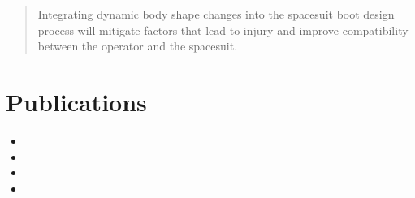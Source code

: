 \documentclass[defaultstyle,11pt]{comps}
\providecommand{\tightlist}{%
  \setlength{\itemsep}{0pt}\setlength{\parskip}{0pt}}
\providecommand{\DIFdeltex}[1]{{\protect\color{red}\sout{#1}}}                      %
\providecommand{\DIFaddbegin}{} %
\providecommand{\DIFaddend}{} %
\providecommand{\DIFdelbegin}{} %
\providecommand{\DIFdelend}{} %
\providecommand{\DIFdel}[1]{\texorpdfstring{\DIFdeltex{#1}}{}} %
\newcommand{\DIFscaledelfig}{0.5}
\newlength{\DIFdelgraphicswidth} %
\newlength{\DIFdelgraphicsheight} %
\newcommand{\DIFaddincludegraphics}[2][]{{\color{blue}\fbox{\DIFOincludegraphics[#1]{#2}}}} %
\newcommand{\DIFdelincludegraphics}[2][]{%
\sbox{\DIFdelgraphicsbox}{\DIFOincludegraphics[#1]{#2}}%
\settoboxwidth{\DIFdelgraphicswidth}{\DIFdelgraphicsbox} %
\settoboxtotalheight{\DIFdelgraphicsheight}{\DIFdelgraphicsbox} %
\scalebox{\DIFscaledelfig}{%
\parbox[b]{\DIFdelgraphicswidth}{\usebox{\DIFdelgraphicsbox}\\[-\baselineskip] \rule{\DIFdelgraphicswidth}{0em}}\llap{\resizebox{\DIFdelgraphicswidth}{\DIFdelgraphicsheight}{%
\setlength{\unitlength}{\DIFdelgraphicswidth}%
\begin{picture}(1,1)%
\thicklines\linethickness{2pt} %
{\color[rgb]{1,0,0}\put(0,0){\framebox(1,1){}}}%
{\color[rgb]{1,0,0}\put(0,0){\line( 1,1){1}}}%
{\color[rgb]{1,0,0}\put(0,1){\line(1,-1){1}}}%
\end{picture}%
}\hspace*{3pt}}} %
} %
\DeclareRobustCommand{\DIFaddbegin}{\DIFOaddbegin \let\includegraphics\DIFaddincludegraphics} %
\DeclareRobustCommand{\DIFaddend}{\DIFOaddend \let\includegraphics\DIFOincludegraphics} %
\DeclareRobustCommand{\DIFdelbegin}{\DIFOdelbegin \let\includegraphics\DIFdelincludegraphics} %
\DeclareRobustCommand{\DIFdelend}{\DIFOaddend \let\includegraphics\DIFOincludegraphics} %
\begin{document}
{\begin{quote}
Integrating dynamic body shape changes into the spacesuit boot design process will mitigate factors that lead to injury and improve compatibility between the operator and the spacesuit.
\end{quote}

\DIFdelbegin %
}\DIFdelend \DIFaddbegin %
\DIFdelend \hypertarget{publications}{%
\section{Publications}\label{publications}}
\DIFdelbegin %
\DIFdelend 

\DIFdelbegin %
\begin{itemize}%
\item%
\item%
\item%
\item%

\end{itemize}%
\end{document}
